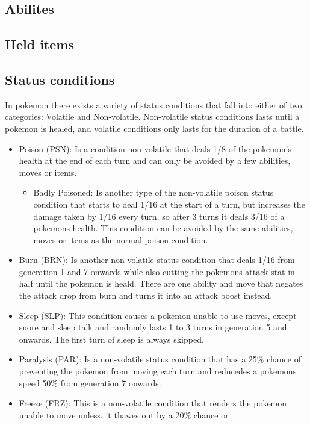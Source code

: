 \subsection{Abilites}
\subsection{Held items}
\subsection{Status conditions}
In pokemon there exists a variety of status conditions that fall into either of two categories: Volatile and Non-volatile. Non-volatile status conditions
lasts until a pokemon is healed, and volatile conditions only lasts for the duration of a battle. \cite{StatusCondition}
\begin{itemize}
  \item Poison (PSN): Is a condition non-volatile that deals 1/8 of the pokemon's health at the end of each turn and can only be avoided by a few abilities,
  moves or items.
  \begin{itemize}
    \item Badly Poisoned: Is another type of the non-volatile poison status condition that starts to deal 1/16 at the start of a turn, 
      but increases the damage taken by 1/16 every turn, so after 3 turns it deals 3/16 of a pokemons health. 
      This condition can be avoided by the same abilities, moves or items as the normal poison condition.
  \end{itemize}
  \item Burn (BRN): Is another non-volatile status condition that deals 1/16 from generation 1 and 7 onwards while also cutting the pokemons attack stat
    in half until the pokemon is heald. There are one ability and move that negates the attack drop from burn and turns it into an attack boost instead.
  \item Sleep (SLP): This condition causes a pokemon unable to use moves, except snore and sleep talk and 
    randomly lasts 1 to 3 turns in generation 5 and onwards. The first turn of sleep is always skipped.
  \item Paralysis (PAR): Is a non-volatile status condition that has a 25\% chance of preventing the pokemon from moving each turn and reducedes a pokemons
    speed 50\% from generation 7 onwards.
  \item Freeze (FRZ): This is a non-volatile condition that renders the pokemon unable to move unless, it thawes out by a 20\% chance or 

\end{itemize}
